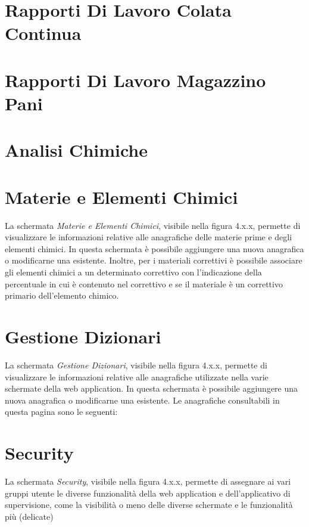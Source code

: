   \section{Rapporti Di Lavoro Colata Continua}

  \section{Rapporti Di Lavoro Magazzino Pani}

  \section{Analisi Chimiche}

  \section{Materie e Elementi Chimici}
  La schermata \textit{Materie e Elementi Chimici}, visibile nella figura 4.x.x, permette di visualizzare le informazioni
  relative alle anagrafiche delle materie prime e degli elementi chimici. In questa schermata è possibile aggiungere una nuova
  anagrafica o modificarne una esistente. Inoltre, per i materiali correttivi è possibile associare gli elementi chimici
  a un determinato correttivo con l'indicazione della percentuale in cui è contenuto nel correttivo e se il materiale è un
  correttivo primario dell'elemento chimico. 

  \section{Gestione Dizionari}
  La schermata \textit{Gestione Dizionari}, visibile nella figura 4.x.x, permette di visualizzare le informazioni relative
  alle anagrafiche utilizzate nella varie schermate della web application. In questa schermata è possibile aggiungere una nuova
  anagrafica o modificarne una esistente. Le anagrafiche consultabili in questa pagina sono le seguenti: 
  
  \section{Security}
  La schermata \textit{Security}, visibile nella figura 4.x.x, permette di assegnare ai vari gruppi utente
  le diverse funzionalità della web application e dell'applicativo di supervisione, come la visibilità o meno delle
  diverse schermate e le funzionalità più (delicate)